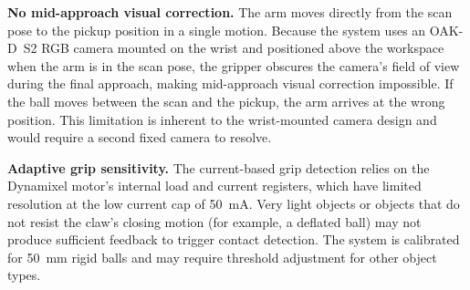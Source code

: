 \textbf{No mid-approach visual correction.} The arm moves
directly from the scan pose to the pickup position in a single
motion. Because the system uses an OAK-D~S2 RGB camera mounted
on the wrist and positioned above the workspace when the arm is
in the scan pose, the gripper obscures the camera's field of view
during the final approach, making mid-approach visual correction impossible.
If the ball moves between the scan and the pickup, the arm
arrives at the wrong position. This limitation is inherent to
the wrist-mounted camera design and would require a second
fixed camera to resolve.

\textbf{Adaptive grip sensitivity.} The current-based grip
detection relies on the Dynamixel motor's internal load and
current registers, which have limited resolution at the low
current cap of 50~mA. Very light objects or objects that do
not resist the claw's closing motion (for example, a deflated
ball) may not produce sufficient feedback to trigger contact
detection. The system is calibrated for 50~mm rigid balls and
may require threshold adjustment for other object types.
